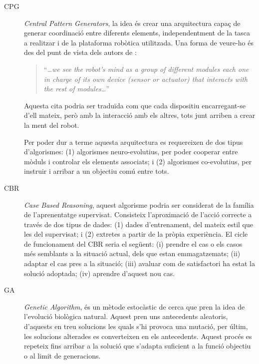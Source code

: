 \documentclass[12pt,a4paper,final,twoside]{report}
\begin{document}
\begin{description}

\item[CPG] \textit{Central Pattern Generators}, la idea és crear una arquitectura capaç de generar coordinació entre diferents elements, independentment de la tasca a realitzar i de la plataforma robòtica utilitzada. Una forma de veure-ho és des del punt de vista dels autors de \cite{Tellez2005a}:
\begin{quotation}
``\textit{\dots we see the robot’s mind as a group of different modules each one in charge of its own device (sensor or actuator) that interacts with the rest of modules\dots}''
\end{quotation}

Aquesta cita podria ser traduïda com que cada dispositiu encarregant-se d'ell mateix, però amb la interacció amb els altres, tots junt arriben a crear la ment del robot.

Per poder dur a terme aquesta arquitectura es requereixen de dos tipus d'algorismes: (1) algorismes neuro-evolutius, per poder cooperar entre mòduls i controlar els elements associats; i (2) algorismes co-evolutius, per instruir i arribar a un objectiu comú entre tots.


\item[CBR] \textit{Case Based Reasoning}, aquest algorisme podria ser considerat de la família de l'aprenentatge supervisat. Consisteix l'aproximació de l'acció correcte a través de dos tipus de dades: (1) dades d'entrenament, del mateix estil que les del supervisat; i (2) extretes a partir de la pròpia experiència. El cicle de funcionament del CBR seria el següent: (i) prendre el cas o els casos més semblants a la situació actual, dels que estan emmagatzemats; (ii) adaptar el cas pres a la situació; (iii) avaluar com de satisfactori ha estat la solució adoptada; (iv) aprendre d'aquest nou cas.

\item[GA] \textit{Genetic Algorithm}, és un mètode estocàstic de cerca que pren la idea de l'evolució biològica natural. Aquest pren uns antecedents aleatoris, d'aquests en treu solucions les quals s'hi provoca una mutació, per últim, les solucions alterades es converteixen en els antecedents. Aquest procés es repeteix fins arribar a la solució que s'adapta suficient a la funció objectiu o al limit de generacions.

\end{description}
\end{document}
